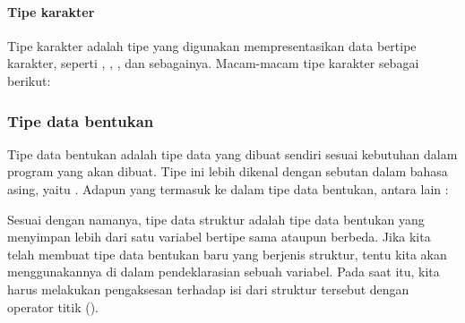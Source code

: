 \documentclass[../main.tex]{subfiles}
\begin{document}
\paragraph{Tipe karakter}
\begin{indentpar}[n]\hpar{}
    Tipe karakter adalah tipe yang digunakan mempresentasikan data bertipe karakter, seperti , , , \citecode{\&} dan sebagainya. Macam-macam tipe karakter sebagai berikut:
\end{indentpar}

\begin{indentpar}[n]
\end{indentpar}
\vspace{-2em}

\subsubsection{Tipe data bentukan}
\begin{indentpar}\hpar{}
    Tipe data bentukan adalah tipe data yang dibuat sendiri sesuai kebutuhan dalam program yang akan dibuat. Tipe ini lebih dikenal dengan sebutan dalam bahasa asing, yaitu {\user} {} {\types}. Adapun yang termasuk ke dalam tipe data bentukan, antara lain \parencite{friyadi2005panduan}:
\end{indentpar}
\newpage
{}
\begin{indentpar}[n]\hpar{}
    Sesuai dengan namanya, tipe data struktur adalah tipe data bentukan yang menyimpan lebih dari satu variabel bertipe sama ataupun berbeda. Jika kita telah membuat tipe data bentukan baru yang berjenis struktur, tentu kita akan menggunakannya di dalam pendeklarasian sebuah variabel. Pada saat itu, kita harus melakukan pengaksesan terhadap isi dari struktur tersebut dengan operator titik ().
\end{indentpar}
\end{document}
